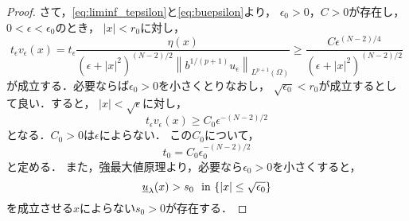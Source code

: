 \begin{proof}
さて，\eqref{eq:liminf_tepsilon}と\eqref{eq:buepsilon}より，
$\epsilon_0 > 0$，$C > 0$が存在し，$0 <\epsilon < \epsilon_0$のとき，
$\lvert x \rvert < r_0$に対し，
\begin{equation}
 t_\epsilon v_\epsilon (x) = t_\epsilon \frac{\eta(x)}{(\epsilon +
 \lvert x \rvert^2)^{(N-2)/2} \left\| b^{1/(p+1)} u_\epsilon
 \right\|_{L^{p+1}(\Omega)}} \geq \frac{C
 \epsilon^{(N-2)/4}}{(\epsilon + \lvert x \rvert^2)^{(N-2)/2}} 
 \label{eq:teve_p}
\end{equation}
が成立する．必要ならば$\epsilon_0 > 0$を小さくとりなおし，
$\sqrt{\epsilon_0} < r_0$が成立するとして良い．すると，
$\lvert x \lvert < \sqrt{\epsilon}$に対し，
\begin{equation}
 t_\epsilon v_\epsilon (x) \geq C_0 \epsilon^{-(N-2)/2} \label{eq:teve}
\end{equation}
となる．$C_0 > 0$は$\epsilon$によらない．
この$C_0$について，
\begin{equation}
 t_0 = C_0 \epsilon_0^{-(N-2)/2} \label{eq:t_0_epsilon}
\end{equation}
と定める．
また，強最大値原理より，必要なら$\epsilon_0 > 0$を小さくすると，
\begin{equation}
 \underline{u}_\lambda (x) > s_0 \ \ \text{in}~ \{ \lvert x \rvert \leq
  \sqrt{\epsilon_0} \}
  \label{eq:uus_0}
\end{equation}
を成立させる$x$によらない$s_0 > 0$が存在する．


\end{proof}
